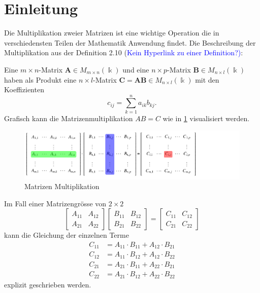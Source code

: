 %
%
%
\section{Einleitung \label{multiplikation:section:einleitung}}

Die Multiplikation zweier Matrizen ist eine wichtige Operation die in verschiedensten Teilen der Mathematik Anwendung findet.
Die Beschreibung der Multiplikation aus der Definition 2.10 (\textcolor{blue} {Kein Hyperlink zu einer Definition?)}:

Eine $m\times n$-Matrix $\mathbf{A}\in M_{m\times n}(\Bbbk)$ und eine
$n\times p$-Matrix $\mathbf{B}\in M_{n\times l}(\Bbbk)$ haben als Produkt
eine $n\times l$-Matrix $\mathbf{C}=\mathbf{AB}\in M_{n\times l}(\Bbbk)$ mit den
Koeffizienten
\begin{equation}
c_{ij} = \sum_{k=1}^n a_{ik} b_{kj}.
\label{multiplikation:eq:MM}
\end{equation}
Grafisch kann die Matrizenmultiplikation $AB=C$ wie in \ref{multiplikation:fig:mm_viz} visualisiert werden.
\begin{figure}
	\center
	\includegraphics[]{papers/multiplikation/images/mm_visualisation}
	\caption{Matrizen Multiplikation}
	\label{multiplikation:fig:mm_viz}
\end{figure}
Im Fall einer Matrizengr\"osse von $2\times 2$
\begin{equation}
  \begin{bmatrix}
A_{11} & A_{12}\\
A_{21} & A_{22}
\end{bmatrix}
\begin{bmatrix}
B_{11} & B_{12}\\
B_{21} & B_{22}
\end{bmatrix}
=
\begin{bmatrix}
C_{11} & C_{12}\\
C_{21} & C_{22}
\end{bmatrix}
\end{equation}
kann die Gleichung der einzelnen Terme
\begin{equation} \label{multiplikation:eq:MM_exp}
\begin{split}
C_{11} &= A_{11} \cdot B_{11} + A_{12} \cdot B_{21}\\
C_{12} &= A_{11} \cdot B_{12} + A_{12} \cdot B_{22}\\
C_{21} &= A_{21} \cdot B_{11} + A_{22} \cdot B_{21}\\
C_{22} &= A_{21} \cdot B_{12} + A_{22} \cdot B_{22}
\end{split}
\end{equation}
explizit geschrieben werden.
